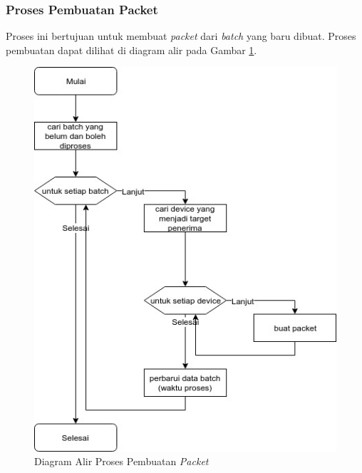 \subsubsection{Proses Pembuatan Packet}
\par Proses ini bertujuan untuk membuat \textit{packet} dari \textit{batch} yang baru dibuat. Proses pembuatan dapat dilihat di diagram alir pada Gambar \ref{flowchart_pembuatan_packet}.
\begin{figure}[hb]
	\caption{Diagram Alir Proses Pembuatan \textit{Packet}} \label{flowchart_pembuatan_packet}
    \centering\includegraphics[width=1\textwidth]{bab3/figures/flowchart_pembuatan_packet.jpg}
\end{figure}

